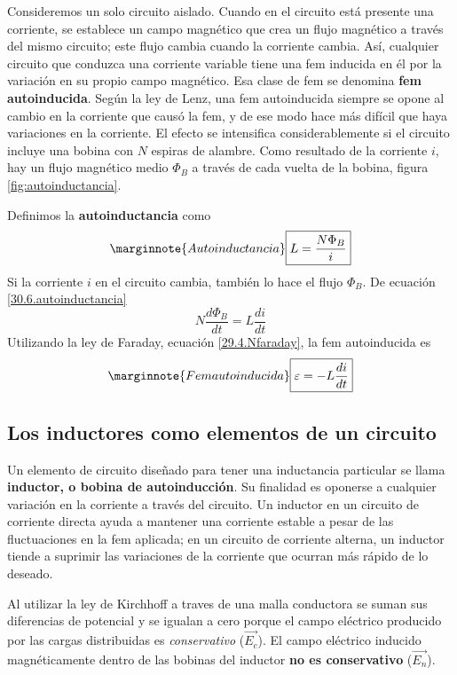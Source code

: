 Consideremos un solo circuito aislado. Cuando en el circuito está presente una corriente, se establece un campo magnético que crea un flujo magnético a través del mismo circuito; este flujo cambia cuando la corriente cambia. Así, cualquier circuito que conduzca una corriente variable tiene una fem inducida en él por la variación en su propio campo magnético. Esa clase de fem se denomina \textbf{fem autoinducida}. Según la ley de Lenz, una fem autoinducida siempre se opone al cambio en la corriente que causó la fem, y de ese modo hace más difícil que haya variaciones en la corriente. El efecto se intensifica considerablemente si el circuito incluye una bobina con $N$ espiras de alambre. Como resultado de la corriente $i$, hay un flujo magnético medio $\Phi_B$ a través de cada vuelta de la bobina, figura \ref{fig:autoinductancia}.

Definimos la \textbf{autoinductancia} como
\begin{equation}\label{30.6.autoinductancia}\marginnote{Autoinductancia}
\boxed{L=\frac{N\Phi_B}{i}}
\end{equation}
Si la corriente $i$ en el circuito cambia, también lo hace el flujo $\Phi_B$. De ecuación \ref{30.6.autoinductancia} $$N\frac{d\Phi_B}{dt}=L\frac{di}{dt}$$ Utilizando la ley de Faraday, ecuación \ref{29.4.Nfaraday}, la fem autoinducida es
\begin{equation}\label{30.7}\marginnote{Fem autoinducida}
\boxed{\varepsilon=-L\frac{di}{dt}}
\end{equation}

\subsection{Los inductores como elementos de un circuito}
Un elemento de circuito diseñado para tener una inductancia particular se llama \textbf{inductor, o bobina de autoinducción}. Su finalidad es oponerse a cualquier variación en la corriente a través del circuito. Un inductor en un circuito de corriente directa ayuda a mantener una corriente estable a pesar de las fluctuaciones en la fem aplicada; en un circuito de corriente alterna, un inductor tiende a suprimir las variaciones de la corriente que ocurran más rápido de lo deseado.

Al utilizar la ley de Kirchhoff a traves de una malla conductora se suman sus diferencias de potencial y se igualan a cero porque el campo eléctrico producido por las cargas distribuidas es \textit{conservativo} ($\vec{E_c}$). El campo eléctrico inducido magnéticamente dentro de las bobinas del inductor \textbf{no es conservativo} ($\vec{E_n}$).


